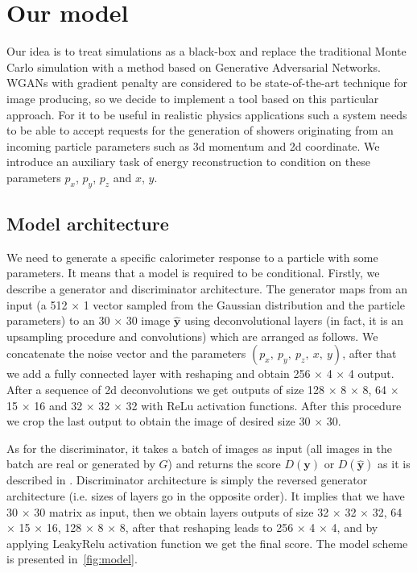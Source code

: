 \section{Our model} \label{sec:model}
Our idea is to treat simulations as a black-box and replace the traditional Monte Carlo simulation with a method based on Generative Adversarial Networks. WGANs with gradient penalty are considered to be state-of-the-art technique for image producing, so we decide to implement a tool based on this particular approach. For it to be useful in realistic physics applications such a system needs to be able to accept requests for the generation of showers originating from an incoming particle parameters such as 3d momentum and 2d coordinate. We introduce an auxiliary task of energy reconstruction to condition on these parameters $p_x$, $p_y$, $p_z$ and $x$, $y$.

\subsection{Model architecture}



We need to generate a specific calorimeter response to a particle with some parameters. It means that a model is required to be conditional.
Firstly, we describe a generator and discriminator architecture. The generator maps from an input (a 512 $\times$ 1 vector sampled from the Gaussian distribution and the particle parameters) to an 30 $\times$ 30 image $\hat{\textbf{y}}$ using deconvolutional layers (in fact, it is an upsampling procedure and convolutions) which are arranged as follows. We concatenate the noise vector and the parameters $(p_x,~ p_y,~ p_z,~ x,~ y)$, after that we add a fully connected layer with reshaping and obtain 256 $\times$ 4 $\times$ 4 output. After a sequence of 2d deconvolutions we get outputs of size  128 $\times$ 8 $\times$ 8, 64 $\times$ 15 $\times$ 16 and 32 $\times$ 32 $\times$ 32  with ReLu activation functions. After this procedure we crop the last output to obtain the image of desired size 30 $\times$ 30.

As for the discriminator, it takes a batch of images as input (all images in the batch are real or generated by $G$) and returns the score $D(\textbf{y})$ or $D(\hat{\textbf{y}})$ as it is described in \cite{arjovsky2017wasserstein}. Discriminator architecture is simply the reversed generator architecture (i.e. sizes of layers go in the opposite order). It implies that we have 30 $\times$ 30 matrix as input, then we obtain layers outputs of size 32 $\times$ 32 $\times$ 32, 64 $\times$ 15 $\times$ 16, 128 $\times$ 8 $\times$  8, after that reshaping leads to 256 $\times$ 4 $\times$ 4, and by applying LeakyRelu activation function we get the final score. The model scheme is presented in~\cref{fig:model}.


